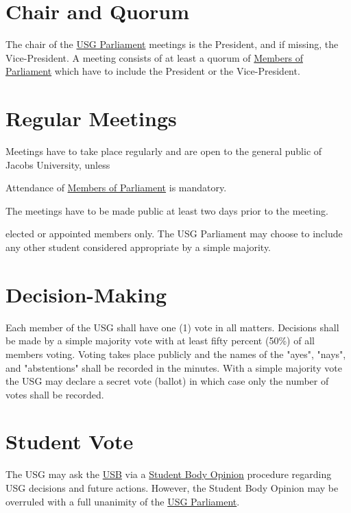 

\section{Chair and Quorum}
The chair of the \hyperref[USGParliamentDef]{USG Parliament} meetings is the President, and if missing, the Vice-President. A meeting consists of at least a quorum of  \hyperref[MPDef]{Members of Parliament} which have to include the President or the Vice-President.

\section{Regular Meetings}
Meetings have to take place regularly and are open to the general public of Jacobs University, unless 
\begin{parenum}
\item Attendance of \hyperref[MPDef]{Members of Parliament} is mandatory.
\item The meetings have to be made public at least two days prior to the meeting.
\item {} elected or appointed members only. The USG Parliament may choose to include any other student  considered appropriate by a simple majority. 
\end{parenum}


\section{Decision-Making} 
Each member of the USG shall have one (1) vote in all matters. Decisions shall be made by a simple majority vote with at least fifty percent (50\%) of all members voting. Voting takes place publicly and the names of the "ayes", "nays", and "abstentions" shall be recorded in the minutes. With a simple majority vote the USG may declare a secret vote (ballot) in which case only the number of votes shall be recorded. 


\section{Student Vote}
The USG may ask the \hyperref[studentbody]{USB} via a \hyperref[StudentOpiniondef]{Student Body Opinion} procedure regarding USG decisions and future actions. However, the Student Body Opinion may be overruled with a full unanimity of the \hyperref[USGParliamentDef]{USG Parliament}.

